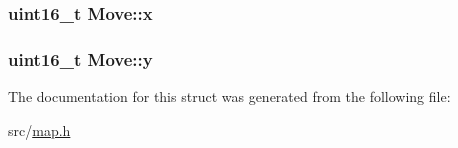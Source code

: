 \subsubsection[{\texorpdfstring{x}{x}}]{\setlength{\rightskip}{0pt plus 5cm}uint16\+\_\+t Move\+::x}\hypertarget{struct_move_ac8bb71aa16911ca5811ff0025a3a7ed0}{}\label{struct_move_ac8bb71aa16911ca5811ff0025a3a7ed0}
\subsubsection[{\texorpdfstring{y}{y}}]{\setlength{\rightskip}{0pt plus 5cm}uint16\+\_\+t Move\+::y}\hypertarget{struct_move_a8e7814eb7fbc1e478ed33e94261c24f2}{}\label{struct_move_a8e7814eb7fbc1e478ed33e94261c24f2}


The documentation for this struct was generated from the following file\+:\begin{DoxyCompactItemize}
\item 
src/\hyperlink{map_8h}{map.\+h}\end{DoxyCompactItemize}
